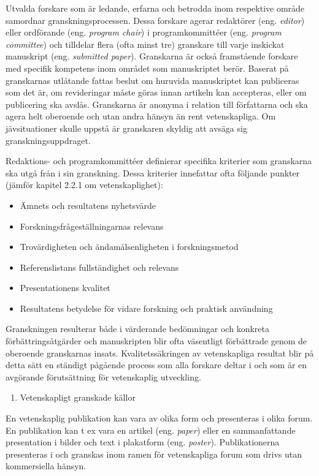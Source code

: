 Utvalda forskare som är ledande, erfarna och betrodda inom respektive
område samordnar granskningsprocessen. Dessa forskare agerar redaktörer
(eng. \emph{editor}) eller ordförande (eng. \emph{program chair}) i
programkommittéer (eng. \emph{program committee}) och tilldelar flera
(ofta minst tre) granskare till varje inskickat manuskript (eng.
\emph{submitted paper}). Granskarna är också framstående forskare med
specifik kompetens inom området som manuskriptet berör. Baserat på
granskarnas utlåtande fattas beslut om huruvida manuskriptet kan
publiceras som det är, om revideringar måste göras innan artikeln kan
accepteras, eller om publicering ska avslås. Granskarna är anonyma i
relation till författarna och ska agera helt oberoende och utan andra
hänsyn än rent vetenskapliga. Om jävsituationer skulle uppstå är
granskaren skyldig att avsäga sig granskningsuppdraget.

Redaktions- och programkommittéer definierar specifika kriterier som
granskarna ska utgå från i sin granskning. Dessa kriterier innefattar
ofta följande punkter (jämför kapitel 2.2.1 om vetenskaplighet):

\begin{itemize}
\item
  Ämnets och resultatens nyhetsvärde
\item
  Forskningsfrågeställningarnas relevans
\item
  Trovärdigheten och ändamålsenligheten i forskningsmetod
\item
  Referenslistans fullständighet och relevans
\item
  Presentationens kvalitet
\item
  Resultatens betydelse för vidare forskning och praktisk användning
\end{itemize}

Granskningen resulterar både i värderande bedömningar och konkreta
förbättringsåtgärder och manuskripten blir ofta väsentligt förbättrade
genom de oberoende granskarnas insats. Kvalitetssäkringen av
vetenskapliga resultat blir på detta sätt en ständigt pågående process
som alla forskare deltar i och som är en avgörande förutsättning för
vetenskaplig utveckling.

\begin{enumerate}
\def\labelenumi{\arabic{enumi}.}
\item
  Vetenskapligt granskade källor
\end{enumerate}

En vetenskaplig publikation kan vara av olika form och presenteras i
olika forum. En publikation kan t ex vara en artikel (eng. \emph{paper})
eller en sammanfattande presentation i bilder och text i plakatform
(eng. \emph{poster}). Publikationerna presenteras i och granskas inom
ramen för vetenskapliga forum som drivs utan kommersiella hänsyn.

